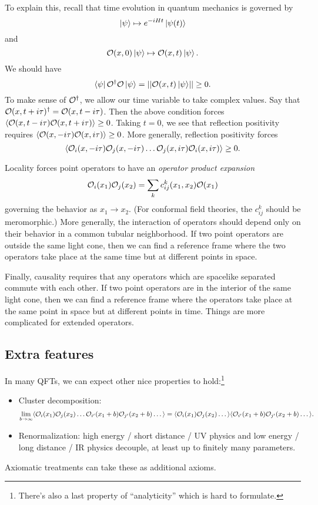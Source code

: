 To explain this, recall that time evolution in quantum mechanics is governed by
\[
	\left|{\psi}\right\rangle \mapsto e^{-i H t} \left|{\psi(t)}\right\rangle
\]
and
\[
	\mathcal{O}(x, 0) \left|{\psi}\right\rangle \mapsto \mathcal{O}(x, t) \left|{\psi}\right\rangle.
\]
We should have
\[
	\left\langle{\psi}\right| \mathcal{O}^\dagger \mathcal{O} \left|{\psi}\right\rangle = \left|\left|{\mathcal{O}(x, t) \left|{\psi}\right\rangle}\right|\right| \geq 0.
\]
To make sense of $\mathcal{O}^\dagger$, we allow our time variable to take complex values.
Say that $\mathcal{O}(x, t + i \tau)^\dagger = \mathcal{O}(x, t - i \tau)$.
Then the above condition forces $\langle \mathcal{O}(x, t - i \tau) \mathcal{O}(x, t + i \tau) \rangle \geq 0$.
Taking $t = 0$, we see that reflection positivity requires $\langle \mathcal{O}(x, -i \tau) \mathcal{O}(x, i \tau) \rangle \geq 0$.
More generally, reflection positivity forces
\[
	\langle \mathcal{O}_i(x, -i \tau) \mathcal{O}_j(x, -i \tau) \dots \mathcal{O}_j(x, i \tau) \mathcal{O}_i(x, i \tau) \rangle \geq 0.
\]

Locality forces point operators to have an \emph{operator product expansion}
\[
	\mathcal{O}_i(x_1) \mathcal{O}_j(x_2) = \sum_k c_{ij}^k(x_1, x_2) \mathcal{O}(x_1)
\]
governing the behavior as $x_1 \to x_2$.
(For conformal field theories, the $c_{ij}^k$ should be meromorphic.)
More generally, the interaction of operators should depend only on their behavior in a common tubular neighborhood.
If two point operators are outside the same light cone, then we can find a reference frame where the two operators take place at the same time but at different points in space.

Finally, causality requires that any operators which are spacelike separated commute with each other.
If two point operators are in the interior of the same light cone, then we can find a reference frame where the operators take place at the same point in space but at different points in time.
Things are more complicated for extended operators.

\subsection{Extra features}

In many QFTs, we can expect other nice properties to hold:\footnote{There's also a last property of ``analyticity'' which is hard to formulate.}
\begin{itemize}
	\item Cluster decomposition:
	\[
	\lim_{b \to \infty} \langle \mathcal{O}_i(x_1) \mathcal{O}_j(x_2) \dots \mathcal{O}_{i'}(x_1 + b) \mathcal{O}_{j'}(x_2 + b) \dots \rangle = \langle \mathcal{O}_i(x_1) \mathcal{O}_j(x_2) \dots \rangle \langle \mathcal{O}_{i'}(x_1 + b) \mathcal{O}_{j'}(x_2 + b) \dots \rangle.
	\]
	\item Renormalization: high energy / short distance / UV physics and low energy / long distance / IR physics decouple, at least up to finitely many parameters.
\end{itemize}
Axiomatic treatments can take these as additional axioms.

